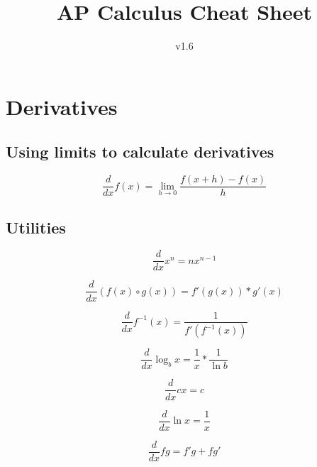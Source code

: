 \documentclass[12pt, english]{article}
\date{}
\title{ AP Calculus Cheat Sheet }
\begin{document}
\author{
	v1.6
}

\maketitle
\tableofcontents
\newpage

\section{Derivatives}
\subsection{Using limits to calculate derivatives}
	\begin{equation}
		\frac{d}{dx} f(x) = \lim_{h \to 0} \frac{f(x+h)-f(x)}{h}
	\end{equation}

\subsection{Utilities}
\begin{equation}
	\frac{d}{dx} x^n = nx^{n-1}
\end{equation}

\noindent
{}
\begin{equation}
	\frac{d}{dx} (f(x) \circ g(x)) = f'(g(x)) * g'(x)
\end{equation}

\noindent
{}
\begin{equation}
	\frac{d}{dx} f^{-1}(x) = \frac{1}{f'(f^{-1}(x))} 
\end{equation}

\noindent
{}
\begin{equation}
	\frac{d}{dx} \log_{b} x = \frac{1}{x} * \frac{1}{\ln b} 
\end{equation}

\noindent
{}
\begin{equation}
	\frac{d}{dx} cx = c 
\end{equation}

\noindent
{}
\begin{equation}
	\frac{d}{dx} \ln x = \frac{1}{x} 
\end{equation}

\noindent
{}
\begin{equation}
	\frac{d}{dx} fg = f'g + fg'
\end{equation}
\end{document}
